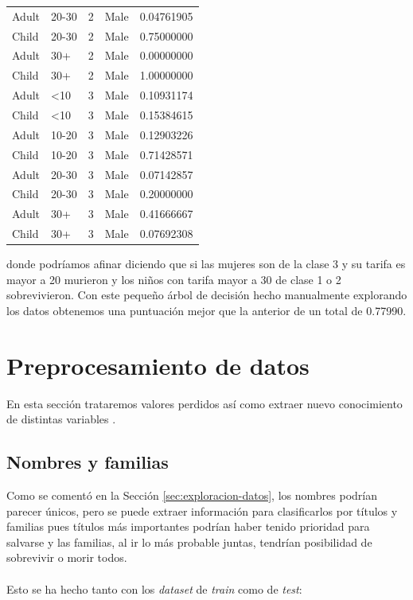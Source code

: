 \begin{table}[H]
\begin{tabular}{|llll|l|}
		Adult & 20-30       & 2      & Male   & 0.04761905 \\
		Child & 20-30       & 2      & Male   & 0.75000000 \\
		Adult & 30+         & 2      & Male   & 0.00000000 \\
		Child & 30+         & 2      & Male   & 1.00000000 \\
		Adult & \textless10 & 3      & Male   & 0.10931174 \\
		Child & \textless10 & 3      & Male   & 0.15384615 \\
		Adult & 10-20       & 3      & Male   & 0.12903226 \\
		Child & 10-20       & 3      & Male   & 0.71428571 \\
		Adult & 20-30       & 3      & Male   & 0.07142857 \\
		Child & 20-30       & 3      & Male   & 0.20000000 \\
		Adult & 30+         & 3      & Male   & 0.41666667 \\
		Child & 30+         & 3      & Male   & 0.07692308 \\ \hline
	\end{tabular}
\end{table}

donde podríamos afinar diciendo que si las mujeres son de la clase 3 y su tarifa es mayor a 20 murieron y los niños con tarifa mayor a 30 de clase 1 o 2 sobrevivieron. Con este pequeño árbol de decisión hecho manualmente explorando los datos obtenemos una puntuación mejor que la anterior de un total de 0.77990.

\section{Preprocesamiento de datos}
\label{sec:preprocesamiento}

En esta sección trataremos valores perdidos así como extraer nuevo conocimiento de distintas variables \cite{TrevorStephensTutorial}.

\subsection{Nombres y familias}

Como se comentó en la Sección \ref{sec:exploracion-datos}, los nombres podrían parecer únicos, pero se puede extraer información para clasificarlos por títulos y familias pues títulos más importantes podrían haber tenido prioridad para salvarse y las familias, al ir lo más probable juntas, tendrían posibilidad de sobrevivir o morir todos.
\\ \\
Esto se ha hecho tanto con los \textit{dataset} de \textit{train} como de \textit{test}:


